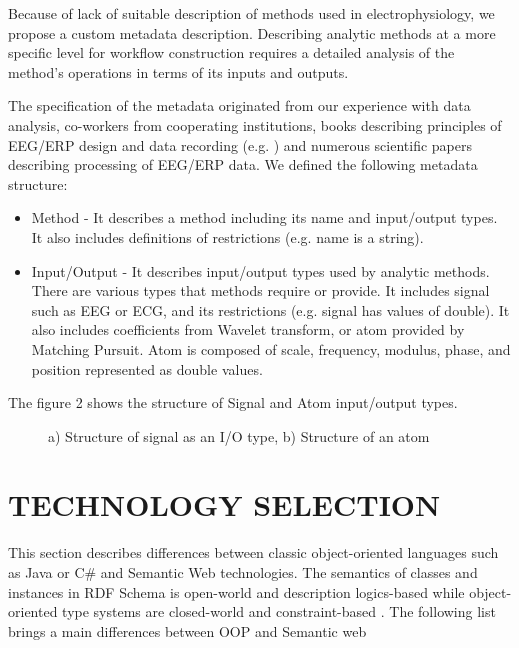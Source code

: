 \documentclass[a4paper,twoside]{article}
\begin{document}
\noindent Because of lack of suitable description of methods used in electrophysiology, we propose a custom metadata description. Describing analytic methods at a more specific level for workflow construction requires a detailed analysis of the method's operations in terms of its inputs and outputs.

The specification of the metadata originated from our experience
with data analysis, co-workers from cooperating institutions,
books describing principles of EEG/ERP design and data
recording (e.g. \cite{Luck05}) and numerous scientific papers describing
processing of EEG/ERP data. We defined the following metadata structure:
\begin{itemize}
	\item Method - It describes a method including its name and input/output types. It also includes definitions of restrictions (e.g. name is a string).
	
	\item Input/Output - It describes input/output types used by analytic methods. There are various types that methods require or provide. It includes signal such as EEG or ECG, and its restrictions (e.g. signal has values of double). It also includes coefficients from Wavelet transform, or atom provided by Matching Pursuit. Atom is composed of scale, frequency, modulus, phase, and position represented as double values.
	
\end{itemize}

The figure 2 shows the structure of Signal and Atom input/output types.

\begin{figure}[!h]

  \centering
   {}
  \caption{a) Structure of signal as an I/O type, b) Structure of an atom }
  \label{fig:SignalAndAtom}
 \end{figure}

\section{\uppercase{Technology Selection}}

\noindent This section describes differences between classic object-oriented languages such as Java or C\# and Semantic Web technologies. The semantics of classes and instances in RDF Schema is open-world and description logics-based while object-oriented type systems are closed-world and constraint-based \cite{Kalyanpur02}. The following list brings a main differences between OOP and Semantic web \cite{Oren07}
\end{document}
